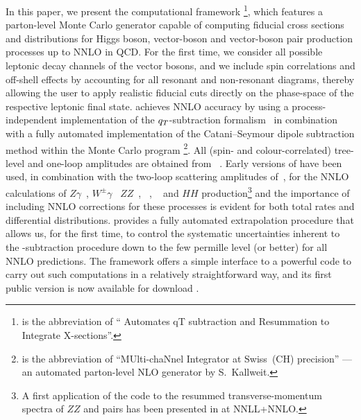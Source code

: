 \documentclass[english,11pt]{article}
\begin{document}
In this paper, we present the computational framework \Matrix{}\footnote{\Matrix{} is the abbreviation of 
``\Munich{} Automates qT subtraction and Resummation to Integrate X-sections''.}, which features a parton-level Monte Carlo generator
capable of computing fiducial cross sections and distributions for Higgs boson, 
vector-boson and vector-boson pair production processes up to NNLO in QCD.
For the first time, we consider all possible leptonic decay channels of 
the vector bosons, and we include spin correlations and off-shell effects by 
accounting for all resonant and non-resonant diagrams, thereby allowing 
the user to apply
realistic fiducial cuts directly on the phase-space of the respective leptonic final state.
\Matrix{} achieves NNLO accuracy by using a process-independent 
implementation of the $q_T$-subtraction formalism~\cite{Catani:2007vq} in combination with
a fully automated implementation of the Catani--Seymour dipole subtraction method \cite{Catani:1996jh,Catani:1996vz}
within the Monte Carlo program \Munich{}\footnote{\Munich{} is the 
abbreviation of ``MUlti-chaNnel Integrator at Swiss~(CH) precision'' --- an automated parton-level NLO 
generator by S.~Kallweit.}.
All (spin- and colour-correlated) tree-level and one-loop amplitudes are obtained from \OpenLoops{}~\cite{Cascioli:2011va,Buccioni:2017yxi}. 
Early versions of \Matrix{} have
been used, in combination with the two-loop scattering amplitudes of~, 
for the NNLO calculations of $Z\gamma$~\cite{Grazzini:2013bna,Grazzini:2015nwa}, $W^\pm\gamma$~\cite{Grazzini:2015nwa} $ZZ$~\cite{Cascioli:2014yka,Grazzini:2015hta}, 
\ww{}~\cite{Gehrmann:2014fva,Grazzini:2016ctr}, \wz{}~\cite{Grazzini:2016swo,Grazzini:2017ckn} and $HH$ \cite{deFlorian:2016uhr}
production\footnote{A first application of the code to the resummed transverse-momentum spectra of $ZZ$ and \ww{} pairs 
has been presented in  at NNLL+NNLO.} 
and the importance of including NNLO corrections for these processes is evident for both total rates and differential distributions. 
\Matrix{} provides a fully automated extrapolation procedure 
that allows us, for the first time, 
to control the systematic uncertainties inherent to the \qt{}-subtraction
procedure down to the few permille level (or better) for all NNLO predictions.
The \Matrix{} framework offers a simple interface to a powerful code to carry out such computations
in a relatively straightforward way, and its first public version is now available for download \cite{MATRIX}.
\end{document}
